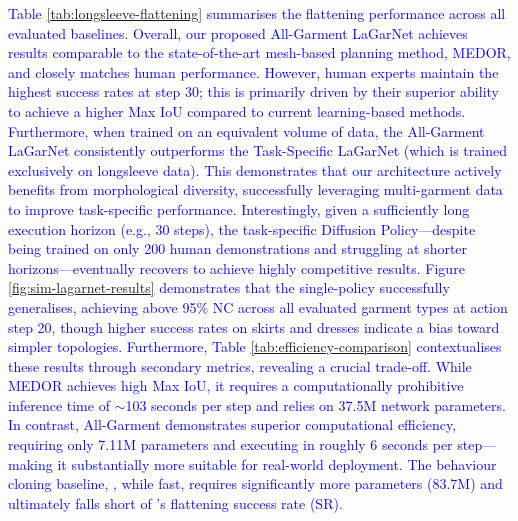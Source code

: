 \documentclass[journal]{IEEEtran}
\newcommand{\addadvantage}[1]{\textcolor{blue}{#1}}
\begin{document}
\addadvantage{Table \ref{tab:longsleeve-flattening} summarises the flattening performance across all evaluated baselines. Overall, our proposed All-Garment LaGarNet achieves results comparable to the state-of-the-art mesh-based planning method, MEDOR, and closely matches human performance. However, human experts maintain the highest success rates at step 30; this is primarily driven by their superior ability to achieve a higher Max IoU compared to current learning-based methods. Furthermore, when trained on an equivalent volume of data, the All-Garment LaGarNet consistently outperforms the Task-Specific LaGarNet (which is trained exclusively on longsleeve data). This demonstrates that our architecture actively benefits from morphological diversity, successfully leveraging multi-garment data to improve task-specific performance. Interestingly, given a sufficiently long execution horizon (e.g., 30 steps), the task-specific Diffusion Policy---despite being trained on only 200 human demonstrations and struggling at shorter horizons---eventually recovers to achieve highly competitive results. Figure \ref{fig:sim-lagarnet-results} demonstrates that the single-policy \text{LaGarNet} successfully generalises, achieving above 95\% NC across all evaluated garment types at action step 20, though higher success rates on skirts and dresses indicate a bias toward simpler topologies.}
\addadvantage{Furthermore, Table \ref{tab:efficiency-comparison} contextualises these results through secondary metrics, revealing a crucial trade-off. While MEDOR achieves high Max IoU, it requires a computationally prohibitive inference time of $\sim$103 seconds per step and relies on 37.5M network parameters. In contrast, All-Garment \text{LaGarNet} demonstrates superior computational efficiency, requiring only 7.11M parameters and executing in roughly 6 seconds per step—making it substantially more suitable for real-world deployment. The behaviour cloning baseline, \text{Diffusion Policy}, while fast, requires significantly more parameters (83.7M) and ultimately falls short of \text{LaGarNet}'s flattening success rate (SR).}
\end{document}
